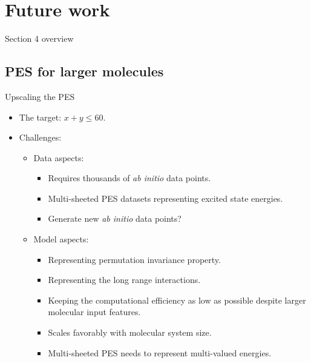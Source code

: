 \documentclass{beamer}
\begin{document}
\section{Future work}
\begin{frame}{Section 4 overview}
    \tableofcontents[sections={4}]
\end{frame}


\subsection{PES for larger molecules}
\begin{frame}{Upscaling the PES}
    \begin{itemize}
        \item The target: $x + y \leq 60$.
        \item Challenges:
        \begin{itemize}
            \item Data aspects: 
            \begin{itemize}
                \item Requires thousands of \textit{ab initio} data points.
                \item Multi-sheeted PES datasets representing excited state energies. 
                \item Generate new \textit{ab initio} data points?
            \end{itemize}
            \item Model aspects:
            \begin{itemize}
                \item Representing permutation invariance property.
                \item Representing the long range interactions.
                \item Keeping the computational efficiency as low as possible despite larger molecular input features.
                \item Scales favorably with molecular system size.
                \item Multi-sheeted PES needs to represent multi-valued energies.
            \end{itemize}
        \end{itemize}
    \end{itemize}
\end{frame}
\end{document}
